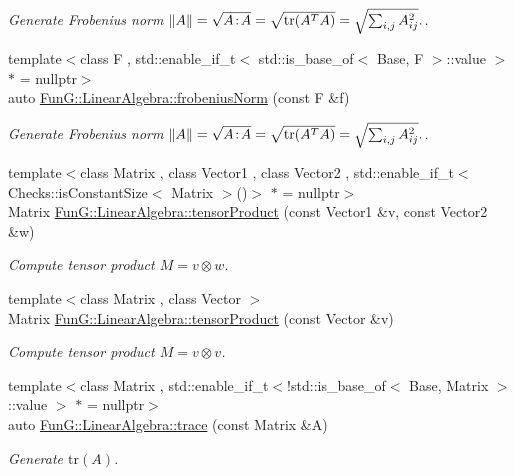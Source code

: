 \begin{DoxyCompactItemize}
\begin{DoxyCompactList}\small\item\em Generate Frobenius norm $ \|A\| = \sqrt{A\negthinspace : \negthinspace A }= \sqrt{\mathrm{tr}(A^TA)} = \sqrt{\sum_{i,j} A_{ij}^2}. $. \end{DoxyCompactList}\item 
{\footnotesize template$<$class F , std\+::enable\+\_\+if\+\_\+t$<$ std\+::is\+\_\+base\+\_\+of$<$ Base, F $>$\+::value $>$ $\ast$  = nullptr$>$ }\\auto \hyperlink{group__LinearAlgebraGroup_gafa2f358f9310cecb787620ad8ec460a6}{Fun\+G\+::\+Linear\+Algebra\+::frobenius\+Norm} (const F \&f)
\begin{DoxyCompactList}\small\item\em Generate Frobenius norm $ \|A\| = \sqrt{A\negthinspace : \negthinspace A }= \sqrt{\mathrm{tr}(A^TA)} = \sqrt{\sum_{i,j} A_{ij}^2}. $. \end{DoxyCompactList}\item 
{\footnotesize template$<$class Matrix , class Vector1 , class Vector2 , std\+::enable\+\_\+if\+\_\+t$<$ Checks\+::is\+Constant\+Size$<$ Matrix $>$()$>$ $\ast$  = nullptr$>$ }\\Matrix \hyperlink{group__LinearAlgebraGroup_ga5d0e066e6184fb3324d96d20087b5578}{Fun\+G\+::\+Linear\+Algebra\+::tensor\+Product} (const Vector1 \&v, const Vector2 \&w)
\begin{DoxyCompactList}\small\item\em Compute tensor product $ M = v \otimes w $. \end{DoxyCompactList}\item 
{\footnotesize template$<$class Matrix , class Vector $>$ }\\Matrix \hyperlink{group__LinearAlgebraGroup_gae5e82b9e66319511dae5ff0d9304a6b7}{Fun\+G\+::\+Linear\+Algebra\+::tensor\+Product} (const Vector \&v)
\begin{DoxyCompactList}\small\item\em Compute tensor product $ M = v \otimes v $. \end{DoxyCompactList}\item 
{\footnotesize template$<$class Matrix , std\+::enable\+\_\+if\+\_\+t$<$!std\+::is\+\_\+base\+\_\+of$<$ Base, Matrix $>$\+::value $>$ $\ast$  = nullptr$>$ }\\auto \hyperlink{group__LinearAlgebraGroup_ga4d73eb4d46dd9196a31e2d6d557d509e}{Fun\+G\+::\+Linear\+Algebra\+::trace} (const Matrix \&A)
\begin{DoxyCompactList}\small\item\em Generate $\mathrm{tr}(A)$. \end{DoxyCompactList}\item 

\end{DoxyCompactItemize}
